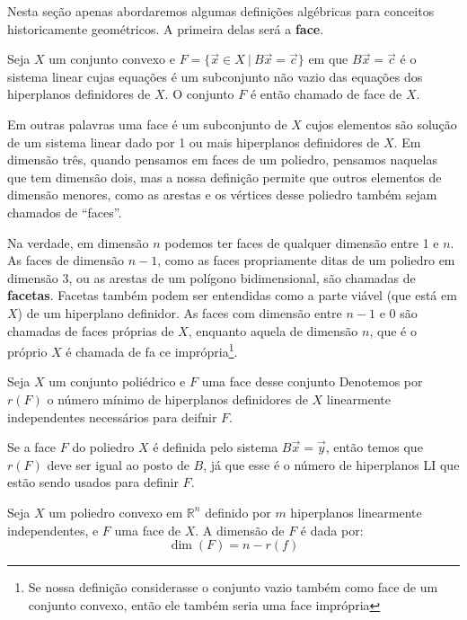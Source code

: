 Nesta seção apenas abordaremos algumas definições algébricas para conceitos
historicamente geométricos. A primeira delas será a \textbf{face}.

\begin{def:face}
	Seja $X$ um conjunto convexo e $F = \{\vec{x} \in X\ |\ B\vec{x} = \vec{c}\}$
	em que $B\vec{x} = \vec{c}$ é o sistema linear cujas equações é um subconjunto
	não vazio das equações dos hiperplanos definidores de $X$. O conjunto $F$ é
	então chamado de face de $X$.
\end{def:face}

Em outras palavras uma face é um subconjunto de $X$ cujos elementos são solução
de um sistema linear dado por 1 ou mais hiperplanos definidores de $X$. Em dimensão três,
quando pensamos em faces de um poliedro, pensamos naquelas que tem dimensão dois,
mas a nossa definição permite que outros elementos de dimensão menores, como as
arestas e os vértices desse poliedro também sejam chamados de ``faces''.

Na verdade, em dimensão $n$ podemos ter faces de qualquer dimensão entre 1 e $n$.
As faces de dimensão $n - 1$, como as faces propriamente ditas de um poliedro em
dimensão 3, ou as arestas de um polígono bidimensional, são chamadas
de \textbf{facetas}. Facetas também podem ser entendidas como a parte viável
(que está em $X$) de um hiperplano definidor.  As faces com dimensão entre
$n - 1$ e $0$ são chamadas de faces próprias de $X$, enquanto aquela de dimensão
$n$, que é o próprio $X$ é chamada de fa
ce imprópria\footnote{Se nossa definição considerasse o conjunto vazio também como
face de um conjunto convexo, então ele também seria uma face imprópria}.

\begin{def:r face}
  Seja $X$ um conjunto poliédrico e $F$ uma face desse conjunto
  Denotemos por $r(F)$ o número
  mínimo de hiperplanos definidores de $X$ linearmente
  independentes necessários para deifnir $F$.
\end{def:r face}

Se a face $F$ do poliedro $X$ é definida pelo sistema $B \vec x = \vec y$,
então temos que $r(F)$ deve ser igual ao posto de $B$, já que esse é
o número de hiperplanos LI que estão sendo usados para definir $F$.

\begin{def:dimensao face}
  Seja $X$ um poliedro convexo em $\mathbb{R}^n$ definido por
  $m$ hiperplanos linearmente independentes, e $F$ uma face
  de $X$. A dimensão de $F$ é dada por:
  \begin{equation*}
  	\dim(F) = n - r(f)
  \end{equation*}
\end{def:dimensao face}

